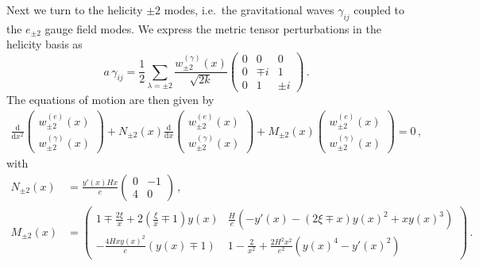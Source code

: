 Next we turn to the helicity $\pm2$ modes, i.e.\ the gravitational waves $\gamma_{ij}$ coupled to the $e_{\pm 2}$ gauge field modes. We express the metric tensor perturbations in the helicity basis as 
\begin{equation}
 a \, \gamma_{ij} = \frac{1}{2} \sum_{\lambda = \pm 2} \frac{w^{(\gamma)}_{\pm 2}(x) }{\sqrt{2k}}\begin{pmatrix}
                                                                    0 & 0 & 0\\
                                                                    0 & \mp i & 1 \\
                                                                    0 & 1 & \pm i
                                                                   \end{pmatrix} \,.
\end{equation}
The  equations of motion are then given by
\begin{align}
 \frac{\textrm{d} }{\textrm{d}x^2}  \left(\begin{array}{c}
   w^{(e)}_{\pm 2}(x)\\
    w^{(\gamma)}_{\pm 2}(x)  
\end{array}\right)
+ N_{\pm 2}(x)  \frac{\textrm{d} }{\textrm{d}x}\left(\begin{array}{c}
  w^{(e)}_{\pm 2}(x)\\
  w^{(\gamma)}_{\pm 2}(x) 
\end{array}\right) + 
  M_{\pm 2}(x)\left(\begin{array}{c}
w^{(e)}_{\pm 2}(x)\\
 w^{(\gamma)}_{\pm 2}(x) 
\end{array}\right)  = 0\,, \label{eq:fulltensor}
\end{align}
with
\begin{align}
 N_{\pm 2}(x) &  =  \frac{y'(x) H x}{e} \begin{pmatrix}
                    0 & - 1 \\
                   4  & 0
                   \end{pmatrix} \,, \\
M_{\pm 2}(x) & = \begin{pmatrix} 
              1  \mp \frac{2\xi}{x} + 2 (\frac{\xi}{x} \mp 1) y (x)  & \frac{H}{e} \left (-y' (x) - (2\xi \mp x) y (x)^2 + 
      x y (x)^3 \right) \\
                   -\frac{4 H x y (x)^2}{e}  (y (x)\mp 1) & 
                 1 - \frac{2}{x^2} +  \frac{2 H^2 x^2}{e^2} \left( y (x)^4 -  y' (x)^2\right)  
                 \end{pmatrix} \,.
\end{align}
